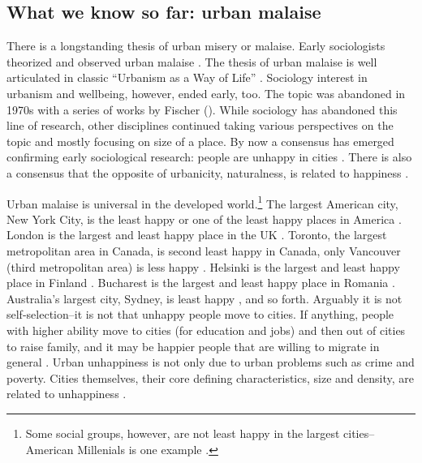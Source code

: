 \documentclass[10pt, letterpaper]{article}
\begin{document}
\begin{spacing}{2.0} %

\section*{What we know so far: urban malaise} %

There is a longstanding thesis of urban misery or malaise. %
Early sociologists theorized and observed urban malaise
\citep{simmel03,tonnies57,park15,wirth38}. The thesis of urban malaise is well
articulated in classic ``Urbanism as a Way of Life'' \citep{wirth38}. Sociology
interest in urbanism and wellbeing, however, ended early, too. The topic was
abandoned in 1970s with a series of works by Fischer (\citeyear{fischer72,fischer73,fischer75, fischer82}).  
While sociology has abandoned this line of research, other disciplines continued
taking various perspectives on the topic and mostly focusing on size of a
place. By now a consensus has emerged confirming early sociological research:
people are unhappy in cities \citep{balducci09, aokcities,
  aok11a,aokCityBook15,aok-ls_fisher16,aok_brfss_city_cize16,morrison15,morrison17}. 
 There is also a consensus that the opposite of urbanicity, naturalness, is related
 to happiness \citep{pretty12, frumkin01b, wheeler12, white13b, white13, tesson13, maller06, berman08,berman12}.  


Urban malaise is universal in the developed world.\footnote{Some social groups,
  however, are not least happy in the largest cities--American Millenials is one
example \citep{aok-swbGenYcity18}.} 
The largest American city, New York City, is the least happy or one of the least
happy places in America \citep{aok_brfss_city_cize16,
  senior_ny_sep16_14}. London is the largest and least happy
place in the UK \citep{ons11,ibt13}. Toronto, the largest metropolitan area in
Canada,  is second least happy in Canada, only Vancouver (third metropolitan area)
is less happy \citep{lu15}. Helsinki is the largest and  least happy place in
Finland \citep{morrison15}. Bucharest is the largest and least happy place in
Romania \citep{lenzi16D}.  Australia's largest city, Sydney, is least happy
\citep[cited in][]{morrison11}, and so forth.
%
Arguably it is not self-selection--it is not that unhappy people move to
cities. If anything, people with higher ability \citep{jokela14}  move to cities
(for education and jobs) and then out
of cities to raise family, and it may be happier people that are willing to
migrate in general \citep{bartram13}.
%
Urban unhappiness is not only due
to urban problems such as crime and poverty.  Cities themselves, their core
defining characteristics, size and density, are related to unhappiness
\citep{aok_brfss_city_cize16}. 


\end{spacing}
\end{document}
